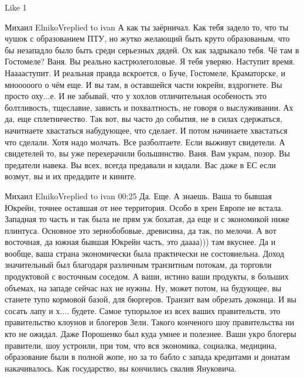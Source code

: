     Like 1

Михаил ElnikoVreplied to ivan
А как ты заёрничал. Как тебя задело то, что ты чушок с образованием ПТУ, но жутко желающий быть круто образованым, что бы незападло было быть среди серьезных дядей.
Ох как задрыкало тебя.
Чё там в Гостомеле?
Ваня. Вы реально кастрюлеголовые.
Я тебя уверяю. Наступит время. Нааааступит. И реальная правда вскроется, о Буче, Гостомеле, Краматорске, и мнооооого о чём еще. И вы там, в оставшейся части юкрейн, вздрогнете. Вы просто оху...е.
И не забывай, что у хохлов отличительная особеность это болтливость, тщеславие, зависть и похвалтность, не говоря о выслуживании. Ах да, еще сплетничество.
Так вот, вы часто до события, не в силах сдержаться, начитнаете хвастаться набудующее, что сделает. И потом начинаете хвастаться что сделали. Хотя надо молчать. Все разболтаете. Если выживут свидетели. А свидетелей то, вы уже перехерачили большинство.
Ваня. Вам украм, позор. Вы предатели навека. Вы всех, всегда предавали и кидали. Вас даже в ЕС если возмут, вы и их предадите и кините.

Михаил ElnikoVreplied to ivan
00:25
Да. Еще.
А знаешь. Ваша то бывшая Юкрейн, точнее оставшая от нее территория. Особо в хрен Европе не встала.
Западная то часть и так была не прям уж бохатая, да еще и с экономикой ниже плинтуса. Основное это зернобобовые, древисина, да так, по мелочи.
А вот восточная, да южная бывшая Юкрейн часть, это даааа))) там вкуснее.
Да и вообще, ваша страна экономически была практически не состояиельна. Доход значительный был благодаря различным транзитным потокам, да торговли продуктовой с восточным соседом.
А ваши, истино ваши продукты, в больших объемах, на западе сейчас нах не нужны. Ну, может потом, на будующее, вы станете тупо кормовой базой, для бюргеров. Транзит вам обрезать доконца. И вы сосать лапу и х.... будете.
Самое тупорылое из всех ваших правительств, это правительство клоунов и блогеров Зели. Такого конченого шоу правительства ни кто не ожидал. Даже Порошенко был куда умнее и полезнее. Ваши укро блогеры правители, шоу устроили, при том, что вся экономика, социалка, медицина, образование были в полной жопе, но за то бабло с запада кредитами и донатам накачивалось.
Как государство, вы кончились свалив Януковича.
